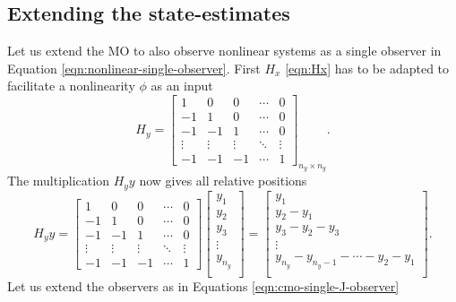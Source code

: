 \subsection{Extending the state-estimates}
Let us extend the MO to also observe nonlinear systems as a single observer in Equation \eqref{eqn:nonlinear-single-observer}. First $H_x$ \eqref{eqn:Hx} has to be adapted to facilitate a nonlinearity $\phi$ as an input
\begin{equation}\label{eqn:Hy}
    H_y = 
    \begin{bmatrix}
        1 & 0 & 0 & \cdots & 0 \\
        -1 & 1 & 0 & \cdots & 0 \\
        -1 & -1 & 1 & \cdots & 0 \\
        \vdots & \vdots & \vdots & \ddots & \vdots \\
        -1 & -1 & -1 & \cdots & 1 
    \end{bmatrix}_{n_y \times n_y}.
\end{equation}
The multiplication $H_yy$ now gives all relative positions
\begin{equation*}
    H_yy =
    \begin{bmatrix}
        1 & 0 & 0 & \cdots & 0 \\
        -1 & 1 & 0 & \cdots & 0 \\
        -1 & -1 & 1 & \cdots & 0 \\
        \vdots & \vdots & \vdots & \ddots & \vdots \\
        -1 & -1 & -1 & \cdots & 1 
    \end{bmatrix}
    \begin{bmatrix}
        y_1 \\ y_2 \\ y_3 \\ \vdots \\ y_{n_y} \\
    \end{bmatrix}
    =
    \begin{bmatrix}
        y_1 \\
        y_2 - y_1 \\
        y_3 - y_2 - y_3 \\
        \vdots \\
        y_{n_y} - y_{n_y-1} - \cdots - y_2 - y_1 \\
    \end{bmatrix}.
\end{equation*}
Let us extend the observers as in Equations \eqref{eqn:cmo-single-J-observer}
